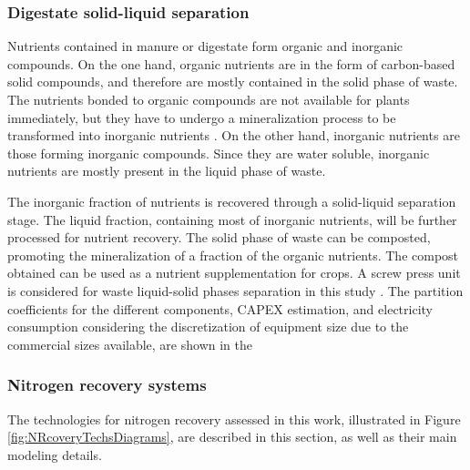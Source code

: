 \begin{refsection}[referencesCh6]
\subsubsection{Digestate solid-liquid separation}
Nutrients contained in manure or digestate form organic and inorganic compounds. On the one hand, organic nutrients are in the form of carbon-based solid compounds, and therefore are mostly contained in the solid phase of waste. The nutrients bonded to organic compounds are not available for plants immediately, but they have to undergo a mineralization process to be transformed into inorganic nutrients \citep{USDAWaste}. On the other hand, inorganic nutrients are those forming inorganic compounds. Since they are water soluble, inorganic nutrients are mostly present in the liquid phase of waste. 

The inorganic fraction of nutrients is recovered through a solid-liquid separation stage. The liquid fraction, containing most of inorganic nutrients, will be further processed for nutrient recovery. The solid phase of waste can be composted, promoting the mineralization of a fraction of the organic nutrients. The compost obtained can be used as a nutrient supplementation for crops. A screw press unit is considered for waste liquid-solid phases separation in this study \citep{MollerSL}. The partition coefficients for the different components, CAPEX estimation, and electricity consumption considering the discretization of equipment size due to the commercial sizes available, are shown in the {}

\subsubsection{Nitrogen recovery systems}
The technologies for nitrogen recovery assessed in this work, illustrated in Figure \ref{fig:NRcoveryTechsDiagrams}, are described in this section, as well as their main modeling details.


\end{refsection}
